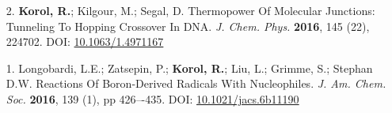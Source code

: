 \documentclass[11pt]{res}
\begin{document}
\begin{resume}
\begin{enumerate}
	\item[2.] \textbf{Korol, R.}; Kilgour,  M.; Segal, D. Thermopower Of Molecular Junctions: Tunneling To Hopping Crossover In DNA. \textit{J. Chem. Phys.} \textbf{2016}, 145 (22), 224702. DOI: \href{http://aip.scitation.org/doi/abs/10.1063/1.4971167}{10.1063/1.4971167}

	\item[1.] Longobardi, L.E.; Zatsepin, P.; \textbf{Korol, R.}; Liu, L.; Grimme, S.; Stephan D.W. Reactions Of Boron-Derived Radicals With Nucleophiles. \textit{J. Am. Chem. Soc.} \textbf{2016}, 139 (1), pp 426–-435. DOI: \href{http://pubs.acs.org/doi/abs/10.1021/jacs.6b11190}{10.1021/jacs.6b11190}
\end{enumerate}
 

\end{resume}
\end{document}

